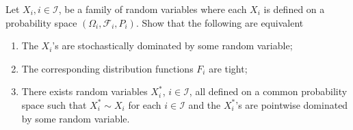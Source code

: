 \begin{exercise}
Let
$X_i, i\in \mathcal I$, be a family of random variables where each $X_i$ is defined on a probability space $(\Omega_i, \mathcal F_i, P_i)$. Show that the following are equivalent
\begin{enumerate}
\item\label{ex: stcho: item 1} The $X_i$'s  are stochastically dominated by some random variable;
\item\label{ex: stcho: item 2} The corresponding distribution functions $F_i$ are tight;
\item\label{ex: stcho: item 3} There exists random variables $X^*_i$, $i\in \mathcal I$, all defined on a common probability space such that $X^*_i\sim X_i$ for each $i\in \mathcal I$ and the $X_i^*$'s are pointwise dominated by some random variable.
\end{enumerate}
\end{exercise}
